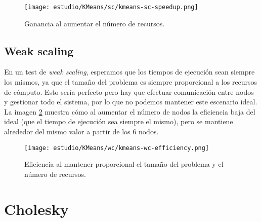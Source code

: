 \begin{figure}[H]
	\centering 
	\caption{Ganancia al aumentar el número de recursos.}
	\texttt{[image: estudio/KMeans/sc/kmeans-sc-speedup.png]}
	\label{fig:sc-speedup}
\end{figure}

\subsection{Weak scaling}

En un test de \textit{weak scaling}, esperamos que los tiempos de ejecución sean siempre los mismos, ya que el tamaño del problema es siempre proporcional a los recursos de cómputo. Esto sería perfecto pero hay que efectuar comunicación entre nodos y gestionar todo el sistema, por lo que no podemos mantener este escenario ideal. La imagen \ref{fig:wc-effic} muestra cómo al aumentar el número de nodos la eficiencia baja del ideal (que el tiempo de ejecución sea siempre el mismo), pero se mantiene alrededor del mismo valor a partir de los 6 nodos.

\begin{figure}[H]
	\centering 
	\caption{Eficiencia al mantener proporcional el tamaño del problema y el número de recursos.}
	\texttt{[image: estudio/KMeans/wc/kmeans-wc-efficiency.png]}
	\label{fig:wc-effic}
\end{figure}

\section{Cholesky}







